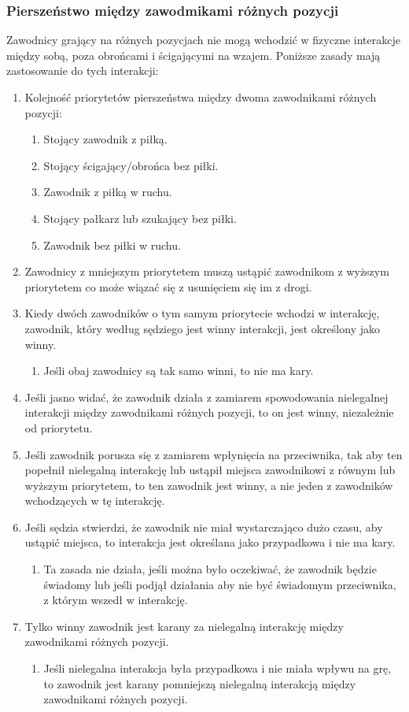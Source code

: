 \documentclass[11pt,a4paper]{article}
\begin{document}
\subsubsection{Pierszeństwo między zawodmikami różnych pozycji}
Zawodnicy grający na różnych pozycjach nie mogą wchodzić w fizyczne interakcje między sobą, poza obrońcami i ścigającymi na wzajem. Poniższe zasady mają zastosowanie do tych interakcji:
\begin{enumerate}
  \item Kolejność priorytetów pierszeństwa między dwoma zawodnikami różnych pozycji:
  \begin{enumerate}
    \item Stojący zawodnik z piłką.
    \item Stojący ścigający/obrońca bez piłki.
    \item Zawodnik z piłką w ruchu.
    \item Stojący pałkarz lub szukający bez piłki.
    \item Zawodnik bez piłki w ruchu.
  \end{enumerate}
  \item Zawodnicy z mniejszym priorytetem muszą ustąpić zawodnikom z wyższym priorytetem co może wiązać się z usunięciem się im z drogi.
  \item Kiedy dwóch zawodników o tym samym priorytecie wchodzi w interakcję, zawodnik, który według sędziego jest winny interakcji, jest określony jako winny.
  \begin{enumerate}
    \item Jeśli obaj zawodnicy są tak samo winni, to nie ma kary.
  \end{enumerate}
  \item Jeśli jasno widać, że zawodnik działa z zamiarem spowodowania nielegalnej interakcji między zawodnikami różnych pozycji, to on jest winny, niezależnie od priorytetu.
  \item Jeśli zawodnik porusza się z zamiarem wpłynięcia na przeciwnika, tak aby ten popełnił nielegalną interakcję lub ustąpił miejsca zawodnikowi z równym lub wyższym priorytetem, to ten zawodnik jest winny, a nie jeden z zawodników wchodzących w tę interakcję.
  \item Jeśli sędzia stwierdzi, że zawodnik nie miał wystarczająco dużo czasu, aby ustąpić miejsca, to interakcja jest określana jako przypadkowa i nie ma kary.
  \begin{enumerate}
    \item Ta zasada nie działa, jeśli można było oczekiwać, że zawodnik będzie świadomy lub jeśli podjął działania aby nie być świadomym przeciwnika, z którym wszedł w interakcję.
  \end{enumerate}
  \item Tylko winny zawodnik jest karany za nielegalną interakcję między zawodnikami różnych pozycji.
  \begin{enumerate}
    \item Jeśli nielegalna interakcja była przypadkowa i nie miała wpływu na grę, to zawodnik jest karany pomniejszą nielegalną interakcją między zawodnikami różnych pozycji.
  \end{enumerate}
\end{enumerate}
\end{document}
